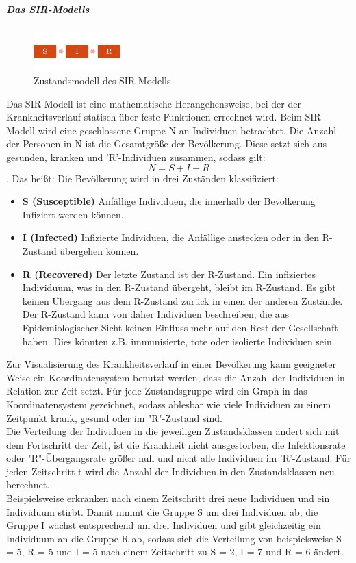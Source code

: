 \subparagraph{Das SIR-Modells}
\begin{figure}
\includegraphics[width= 0.3\textwidth]{./images/SIR-Modell.jpg}\caption{Zustandsmodell des SIR-Modells}
\end{figure}
Das SIR-Modell ist eine mathematische Herangehensweise, bei der der Krankheitsverlauf statisch über feste Funktionen errechnet wird.
Beim SIR-Modell wird eine geschlossene Gruppe N an Individuen betrachtet. Die Anzahl der Personen in N ist die Gesamtgröße der Bevölkerung.
Diese setzt sich aus gesunden, kranken und 'R'-Individuen zusammen, sodass gilt:
\begin{equation}
N = S + I + R
\end{equation}
. Das heißt: Die Bevölkerung wird in drei Zuständen klassifiziert:
\begin{itemize}
\item \textbf{S (Susceptible)} Anfällige Individuen, die innerhalb der Bevölkerung Infiziert werden können.
\item \textbf{I (Infected)} Infizierte Individuen, die Anfällige anstecken  oder in den R-Zustand übergehen können.
\item \textbf{R (Recovered)} Der letzte Zustand ist der R-Zustand. Ein infiziertes Individuum, was in den R-Zustand übergeht, bleibt im R-Zustand. Es gibt keinen Übergang aus dem R-Zustand zurück in einen der anderen Zustände. Der R-Zustand kann von daher Individuen beschreiben, die aus Epidemiologischer Sicht keinen Einfluss mehr auf den Rest der Gesellschaft haben. Dies könnten z.B. immunisierte, tote oder isolierte Individuen sein.
\end{itemize}
Zur Visualisierung des Krankheitsverlauf in einer Bevölkerung kann geeigneter Weise ein Koordinatensystem benutzt werden, dass die Anzahl der Individuen in Relation zur Zeit setzt.
Für jede Zustandsgruppe wird ein Graph in das Koordinatensystem gezeichnet, sodass ablesbar wie viele Individuen zu einem Zeitpunkt krank, gesund oder im "R"-Zustand sind.\\
Die Verteilung der Individuen in die jeweiligen Zustandsklassen ändert sich mit dem Fortschritt der Zeit, ist die Krankheit nicht ausgestorben, die Infektionsrate oder "R"-Übergangsrate größer null und nicht alle Individuen im 'R'-Zustand.
Für jeden Zeitschritt t wird die Anzahl der Individuen in den Zustandsklassen neu berechnet.\\
Beispielsweise erkranken nach einem Zeitschritt drei neue Individuen und ein Individuum stirbt. Damit nimmt die Gruppe S um drei Individuen ab, die Gruppe I wächst entsprechend um drei Individuen und gibt gleichzeitig ein Individuum an die Gruppe R ab, sodass sich die Verteilung von beispielsweise S = 5, R = 5 und I = 5 nach einem Zeitschritt zu S = 2, I = 7 und R = 6 ändert.

